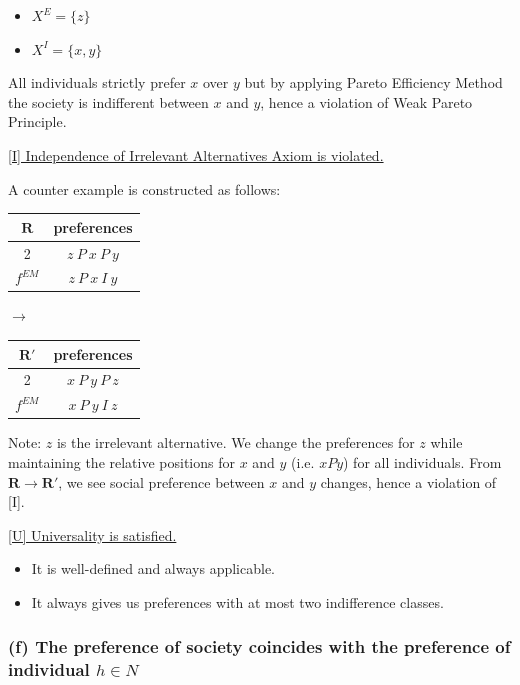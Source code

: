 \documentclass[a4paper]{article}
\begin{document}
\begin{itemize}
    \item $X^E=\{z \}$
    \item $X^I=\{x,y \}$
\end{itemize}

All individuals strictly prefer $x$ over $y$ but by applying Pareto Efficiency Method the society is indifferent between $x$ and $y$, hence a violation of Weak Pareto Principle.

\underline{[I] Independence of Irrelevant Alternatives Axiom is violated.}

A counter example is constructed as follows:

\begin{table}[!htbp]
    \centering
    \begin{tabular}{c|c|}
        $\mathbf{R}$ & preferences         \\ 
        \hline
        2  & $z\: P\: x\: P\: y$ \\
        \hline 
        $f^{EM}$ & $z\: P\: x\: I\: y$
    \end{tabular}
    \qquad $\to$ \qquad
    \centering
    \begin{tabular}{c|c|}
        $\mathbf{R'}$ & preferences         \\ 
        \hline
        2  & $x\: P\: y\: P\: z$ \\
        \hline 
        $f^{EM}$ & $x\: P\: y\: I\: z$
    \end{tabular}
\end{table}

Note: $z$ is the irrelevant alternative. We change the preferences for $z$ while maintaining the relative positions for $x$ and $y$ (i.e. $xPy$) for all individuals. From $\mathbf{R}\to\mathbf{R'}$, we see social preference between $x$ and $y$ changes, hence a violation of [I].

\underline{[U] Universality is satisfied.}

\begin{itemize}
    \item It is well-defined and always applicable.
    \item It always gives us preferences with at most two indifference classes.
\end{itemize}

\subsubsection*{(f) The preference of society coincides with the preference of individual $h\in N$}
\end{document}
